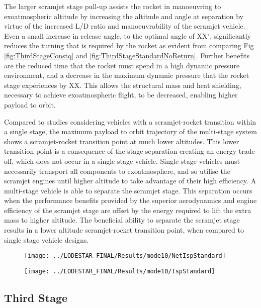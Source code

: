 The larger scramjet stage pull-up assists the rocket in manoeuvring to exoatmospheric altitude by increasing the altitude and angle at separation by virtue of the increased L/D ratio and manoeuvrability of the scramjet vehicle. Even a small increase in release angle, to the optimal angle of XX$^\circ$, significantly reduces the turning that is required by the rocket as evident from comparing Fig \ref{fig:ThirdStageConstq} and \ref{fig:ThirdStageStandardNoReturn}. Further benefits are the reduced time that the rocket must spend in a high dynamic pressure environment, and a decrease in the maximum dynamic pressure that the rocket stage experiences by XX. This allows the structural mass and heat shielding, necessary to achieve exoatmospheric flight, to be decreased, enabling higher payload to orbit. 


Compared to studies considering vehicles with a scramjet-rocket transition within a single stage\cite{Lu1993}\cite{Trefny1999}, the maximum payload to orbit trajectory of the multi-stage system shows a scramjet-rocket transition point at much lower altitudes.
This lower transition point is a consequence of the stage separation creating an energy trade-off, which does not occur in a single stage vehicle. Single-stage vehicles must necessarily transport all components to exoatmosphere, and so utilise the scramjet engines until higher altitude to take advantage of their high efficiency. A multi-stage vehicle is able to separate the scramjet stage. 
This separation occurs when the performance benefits provided by the superior aerodynamics and engine efficiency of the scramjet stage are offset by the energy required to lift the extra mass to higher altitude. The beneficial ability
to separate the scramjet stage results in a lower altitude scramjet-rocket transition point, when compared to single
stage vehicle designs.




\begin{figure}[ht]
	\centering
	\texttt{[image: ../LODESTAR\_FINAL/Results/mode10/NetIspStandard]}
	\caption{}
	\label{fig:NetIspStandardNoReturn}
\end{figure}

\begin{figure}
\centering
\texttt{[image: ../LODESTAR\_FINAL/Results/mode10/IspStandard]}
\caption{}
\label{fig:IspStandard}
\end{figure}

\subsection{Third Stage}

